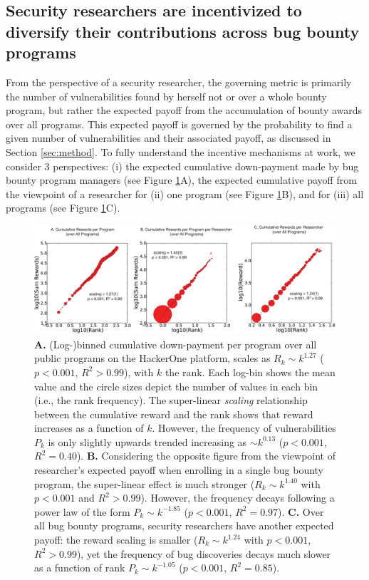 \subsection{Security researchers are incentivized to diversify their contributions across bug bounty programs}
From the perspective of a security researcher, the governing metric is primarily the number of vulnerabilities found by herself not or over a whole bounty program, but rather the expected payoff from the accumulation of bounty awards over all programs. This expected payoff is governed by the probability to find a given number of vulnerabilities and their associated payoff, as discussed in Section \ref{sec:method}. To fully understand the incentive mechanisms at work, we consider 3 perspectives: (i) the expected cumulative down-payment made by bug bounty program managers (see Figure \ref{fig:scalings_awards}A), the expected cumulative payoff from the viewpoint of a researcher for (ii) one program (see Figure \ref{fig:scalings_awards}B), and for (iii) all programs (see Figure \ref{fig:scalings_awards}C).\\


\begin{figure}[Ht]
\begin{center}
\includegraphics[width=12cm]{figures/scalings_awards.eps}
\caption{{\bf A.} (Log-)binned cumulative down-payment per program over all public programs on the HackerOne platform, scales as $R_{k} \sim k^{1.27}$ ($ p < 0.001$, $R^2 > 0.99$), with $k$ the rank. Each log-bin shows the mean value and the circle sizes depict the number of values in each bin (i.e., the rank frequency). The super-linear {\it scaling} relationship between the cumulative reward and the rank shows that reward increases as a function of $k$. However, the frequency of vulnerabilities $P_k$ is only slightly upwards trended increasing as $ \sim k^{0.13}$ ($ p < 0.001$, $R^2 = 0.40$). {\bf B.} Considering the opposite figure from the viewpoint of researcher's expected payoff when enrolling in a single bug bounty program, the super-linear effect is much stronger ($R_{k} \sim k^{1.40}$ with $ p < 0.001$ and $R^2 > 0.99$). However, the frequency decays following a power law of the form $P_{k} \sim k^{-1.85}$ ($ p < 0.001$, $R^2 = 0.97$). {\bf C.} Over all bug bounty programs, security researchers have another expected payoff: the reward scaling is smaller ($R_{k} \sim k^{1.24}$ with $ p < 0.001$, $R^2 > 0.99$), yet the frequency of bug discoveries decays much slower as a function of rank $P_{k} \sim k^{-1.05}$ ($ p < 0.001$, $R^2 = 0.85$).}
\label{fig:scalings_awards}
\end{center}
\end{figure}


